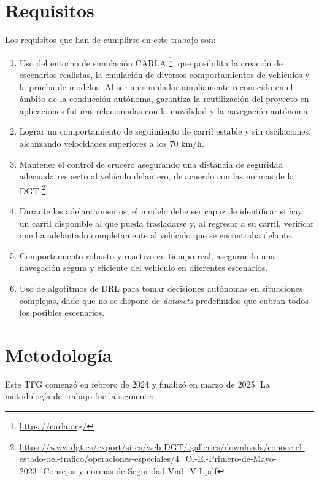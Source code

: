 \section{Requisitos}
\label{sec:requisitos}

Los requisitos que han de cumplirse en este trabajo son: 
\begin{enumerate}
    \item Uso del entorno de simulación CARLA \footnote{\url{https://carla.org/}}, que posibilita la creación de escenarios realistas, la emulación de diversos comportamientos de vehículos y la prueba de modelos. Al ser un simulador ampliamente reconocido en el ámbito de la conducción autónoma, garantiza la reutilización del proyecto en aplicaciones futuras relacionadas con la movilidad y la navegación autónoma.
    \item Lograr un comportamiento de seguimiento de carril estable y sin oscilaciones, alcanzando velocidades superiores a los 70 km/h.
    \item Mantener el control de crucero asegurando una distancia de seguridad adecuada respecto al vehículo delantero, de acuerdo con las normas de la \ac{DGT} \footnote{\url{https://www.dgt.es/export/sites/web-DGT/.galleries/downloads/conoce-el-estado-del-trafico/operaciones-especiales/4_O.-E.-Primero-de-Mayo-2023_Consejos-y-normas-de-Seguridad-Vial_V-I.pdf}}.
   \item Durante los adelantamientos, el modelo debe ser capaz de identificar si hay un carril disponible al que pueda trasladarse y, al regresar a su carril, verificar que ha adelantado completamente al vehículo que se encontraba delante.
    \item Comportamiento robusto y reactivo en tiempo real, asegurando una navegación segura y eficiente del vehículo en diferentes escenarios.
    \item Uso de algotitmos de \ac{DRL} para tomar decisiones autónomas en situaciones complejas, dado que no se dispone de \textit{datasets} predefinidos que cubran todos los posibles escenarios.
\end{enumerate}

\section{Metodología}
\label{sec:metodologia}

Este TFG comenzó en febrero de 2024 y finalizó en marzo de 2025. La metodología de trabajo fue la siguiente:

